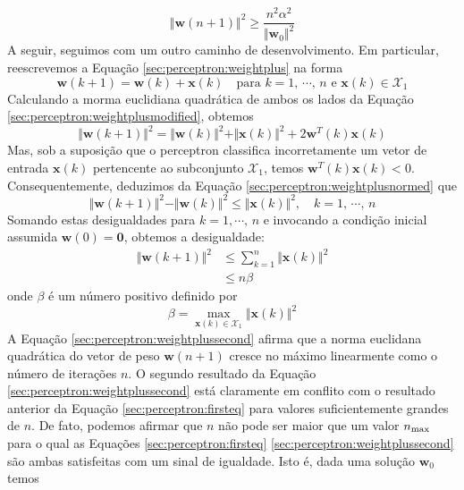 \begin{equation}\label{sec:perceptron:firsteq}
  \Vert \textbf{w}(n+1) \Vert^2\geq \frac{n^2\alpha^2}{\Vert \textbf{w}_0\Vert^2}
\end{equation}
A seguir, seguimos com um outro caminho de desenvolvimento. Em particular, reescrevemos a Equação \ref{sec:perceptron:weightplus} na forma
\begin{equation}\label{sec:perceptron:weightplusmodified}
  \textbf{w}(k+1)=\textbf{w}(k)+\textbf{x}(k)\quad \text{para $k=1,\,\cdots,\,n$ e $\textbf{x}(k)\in \mathscr{X}_1$}
\end{equation}
Calculando a morma euclidiana quadrática de ambos os lados da Equação \ref{sec:perceptron:weightplusmodified}, obtemos
\begin{equation}\label{sec:perceptron:weightplusnormed}
  \Vert \textbf{w}(k+1) \Vert^2= \Vert \textbf{w}(k) \Vert^2+\Vert \textbf{x}(k) \Vert^2+2\textbf{w}^T(k)\textbf{x}(k)
\end{equation}
Mas, sob a suposição que o perceptron classifica incorretamente um vetor de entrada $\textbf{x}(k)$ pertencente ao subconjunto $\mathscr{X}_1$, temos $\textbf{w}^T(k)\textbf{x}(k)<0$. Consequentemente, deduzimos da Equação \ref{sec:perceptron:weightplusnormed} que
\begin{equation*}\label{sec:perceptron:weightplusnormeddiff}
  \Vert \textbf{w}(k+1) \Vert^2- \Vert \textbf{w}(k) \Vert^2\leq  \Vert \textbf{x}(k) \Vert^2, \quad k=1,\,\cdots,\, n
\end{equation*}
Somando estas desigualdades para $k=1,\cdots,\, n$ e invocando a condição inicial assumida $\textbf{w}(0)=\textbf{0}$, obtemos a desigualdade:
\begin{equation}
  \begin{aligned} \label{sec:perceptron:weightplussecond}
    \Vert \textbf{w}(k+1) \Vert^2 &\leq \sum_{k=1}^n \Vert \textbf{x}(k) \Vert^2\\
    &\leq n\beta
  \end{aligned}
\end{equation}
onde $\beta$ é um número positivo definido por
\begin{equation}\label{sec:perceptron:beta}
  \beta=\max_{\textbf{x}(k)\in\mathscr{X}_1}\Vert\textbf{x}(k)\Vert^2
\end{equation}
A Equação \ref{sec:perceptron:weightplussecond} afirma que a norma euclidana quadrática do vetor de peso $\textbf{w}(n+1)$ cresce no máximo linearmente como o número de iterações $n$.
  O segundo resultado da Equação \ref{sec:perceptron:weightplussecond} está claramente em conflito com o resultado anterior da Equação \ref{sec:perceptron:firsteq} para valores suficientemente grandes de $n$. De fato, podemos afirmar que $n$ não pode ser maior que um valor $n_{\rm max}$ para o qual as Equações \ref{sec:perceptron:firsteq} \ref{sec:perceptron:weightplussecond} são ambas satisfeitas com um sinal de igualdade. Isto é, dada uma solução $\textbf{w}_0$ temos
